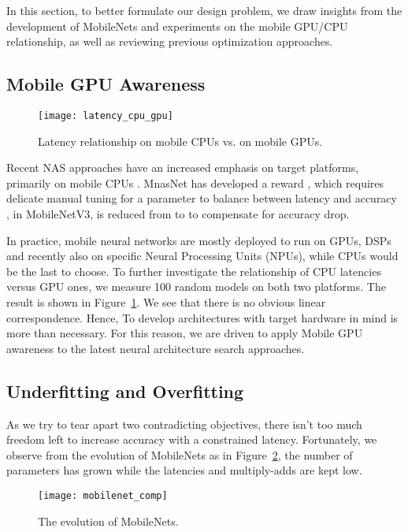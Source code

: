 \documentclass[letterpaper]{article} \usepackage{aaai20}  \usepackage{times}  \usepackage{helvet} \usepackage{courier}  \usepackage[hyphens]{url}  \usepackage{graphicx} \urlstyle{rm} \def\UrlFont{\rm}  \usepackage{graphicx}  \usepackage{amsmath}
\begin{document}
In this section, to better formulate our design problem, we draw insights from the development of MobileNets and experiments on the mobile GPU/CPU relationship, as well as reviewing previous optimization approaches.  
 
\subsection{Mobile GPU Awareness}
\begin{figure}[ht]
\centering
{
\texttt{[image: latency\_cpu\_gpu]}
}
\caption{Latency relationship on mobile CPUs vs. on mobile GPUs.}
\label{fig:latency_cpu_gpu}
\end{figure}
Recent NAS approaches have an increased emphasis on target platforms, primarily on mobile CPUs \cite{tan2018mnasnet,dong2018dpp,wu2018fbnet,cai2018proxylessnas,stamoulis2019single,howard2019searching}. MnasNet has developed a reward , which requires delicate manual tuning for a parameter  to balance between  latency and accuracy \cite{tan2018mnasnet}, in MobileNetV3,  is reduced from  to  \cite{howard2019searching} to compensate for accuracy drop.

In practice, mobile neural networks are mostly deployed to run on GPUs, DSPs and recently also on specific Neural Processing Units (NPUs), while CPUs would be the last to choose. To further investigate the relationship of CPU latencies versus GPU ones, we measure 100 random models on both two platforms. The result is shown in Figure~\ref{fig:latency_cpu_gpu}. We see that there is no obvious linear correspondence. Hence, 
To develop architectures with target hardware in mind is more than necessary. For this reason, we are driven to apply Mobile GPU awareness to the latest neural architecture search approaches. 



\subsection{Underfitting and Overfitting}
\label{sec:more_params}
As we try to tear apart two contradicting objectives, there isn't too much freedom left to increase accuracy with a constrained latency. Fortunately, we observe from the evolution of MobileNets as in Figure~\ref{fig:mobilenet-comp}, the number of parameters has grown while the latencies and multiply-adds are kept low.

\begin{figure}[ht]
\centering
{
\texttt{[image: mobilenet\_comp]}
}
\caption{The evolution of MobileNets.}
\label{fig:mobilenet-comp}
\end{figure}
\end{document}
